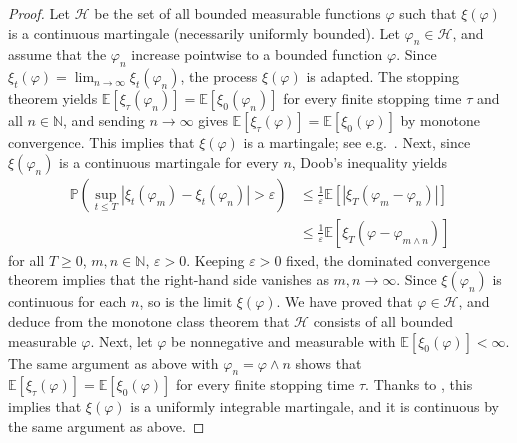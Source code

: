 \documentclass{article}
\theoremstyle{definition}
\numberwithin{equation}{section}
\numberwithin{theorem}{section}
\newcommand{\E}{\mathbb{E}}
\renewcommand{\P}{\mathbb{P}}
\renewcommand{\P}{{\mathbb P}}
\newcommand{\N}{{\mathbb N}}
\newcommand{\Hcal}{{\mathcal H}}
\begin{document}
\begin{proof}
Let $\Hcal$ be the set of all bounded measurable functions $\varphi$
such that $\xi(\varphi)$ is a continuous
martingale (necessarily uniformly bounded). Let $\varphi_n\in\Hcal$, and assume that the $\varphi_n$
increase pointwise to a bounded function $\varphi$. Since $\xi_t(\varphi) = \lim_{n\to\infty} \xi_t(\varphi_n)$, the process $\xi(\varphi)$
is adapted.  The stopping theorem yields $\E[\xi_\tau(\varphi_n)]=\E[\xi_0(\varphi_n)]$ for every finite stopping time $\tau$ and all $n\in\N$, and sending $n\to\infty$ gives $\E[\xi_\tau(\varphi)]=\E[\xi_0(\varphi)]$ by monotone convergence. This implies that $\xi(\varphi)$ is a martingale; see e.g.\ \cite[Proposition~II.1.4]{MR1725357}. Next, since $\xi(\varphi_n)$ is a continuous martingale for every $n$, Doob's inequality yields
\begin{align*}
\P\left( \sup_{t\le T}|\xi_t(\varphi_m)-\xi_t(\varphi_n)| > \varepsilon \right) &\le \frac1\varepsilon \E[|\xi_T(\varphi_m - \varphi_n)|] \\
&\le \frac1\varepsilon \E[\xi_T(\varphi - \varphi_{m\wedge n})]
\end{align*}
for all $T\ge0$, $m,n\in\N$, $\varepsilon>0$. Keeping $\varepsilon>0$ fixed, the dominated convergence theorem implies that the right-hand side vanishes as $m,n\to\infty$. Since $\xi(\varphi_n)$ is continuous for each $n$, so is the limit $\xi(\varphi)$. We have proved that $\varphi\in\Hcal$, and deduce from the monotone class theorem that $\Hcal$ consists of all bounded measurable $\varphi$. Next, let $\varphi$ be nonnegative and measurable with $\E[\xi_0(\varphi)]<\infty$. The same argument as above with $\varphi_n=\varphi\wedge n$ shows that $\E[\xi_\tau(\varphi)]=\E[\xi_0(\varphi)]$ for every finite stopping time $\tau$. Thanks to \cite[Theorem~5.1]{MR2233537}, this implies that $\xi(\varphi)$ is a uniformly integrable martingale, and it is continuous by the same argument as above.
\end{proof}
\end{document}
